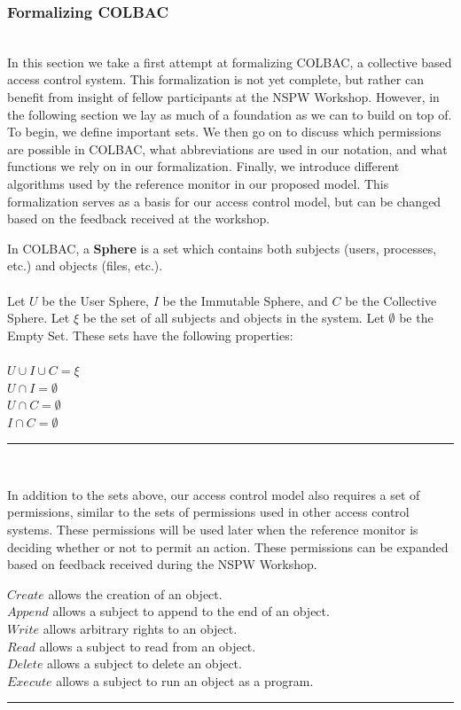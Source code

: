 \subsubsection{Formalizing COLBAC}
\label{sec:colbacformal}
\mbox{}\\
In this section we take a first attempt at formalizing COLBAC, a collective
based access control system. This formalization is not yet complete, but rather
can benefit from insight of fellow participants at the NSPW Workshop. However,
in the following section we lay as much of a foundation as we can to build on
top of. To begin, we define important sets. We then go on to discuss which
permissions are possible in COLBAC, what abbreviations are used in our notation,
and what functions we rely on in our formalization. Finally, we introduce
different algorithms used by the reference monitor in our proposed model. This
formalization serves as a basis for our access control model, but can be changed
based on the feedback received at the workshop.
\begin{definition}\label{def:spheres}
In COLBAC, a \textbf{Sphere} is a set which contains both subjects (users,
processes, etc.) and objects (files, etc.).\\
\mbox{}\\
Let $U$ be the User Sphere, $I$ be the Immutable Sphere, and $C$ be the
Collective Sphere. Let $\xi$ be the set of all subjects and objects in the
system. Let $\emptyset$ be the Empty Set. These sets have the following
properties:\\
\mbox{}\\
$U \cup I \cup C = \xi$\\
$U \cap I = \emptyset$\\
$U \cap C = \emptyset$\\
$I \cap C = \emptyset$\\
\hrule \mbox{}\\
\end{definition}

\noindent In addition to the sets above, our access control model also requires
a set of permissions, similar to the sets of permissions used in other access
control systems. These permissions will be used later when the reference monitor
is deciding whether or not to permit an action. These permissions can be
expanded based on feedback received during the NSPW Workshop.

\begin{definition}\label{def:permissions}
$Create$ allows the creation of an object.\\
$Append$ allows a subject to append to the end of an object.\\
$Write$ allows arbitrary rights to an object. \\
$Read$ allows a subject to read from an object.\\
$Delete$ allows a subject to delete an object. \\
$Execute$ allows a subject to run an object as a program.\\
\hrule \mbox{}\\
\end{definition}

